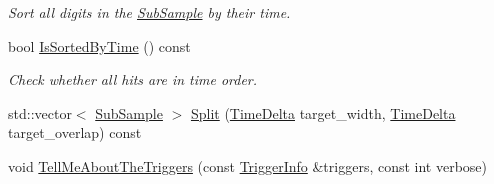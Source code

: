 \begin{DoxyCompactItemize}
\begin{DoxyCompactList}\small\item\em Sort all digits in the \hyperlink{classSubSample}{Sub\-Sample} by their time. \end{DoxyCompactList}\item 
\hypertarget{classSubSample_ab2b86eb86fd4c4e7d57b38241de53803}{bool \hyperlink{classSubSample_ab2b86eb86fd4c4e7d57b38241de53803}{Is\-Sorted\-By\-Time} () const }\label{classSubSample_ab2b86eb86fd4c4e7d57b38241de53803}

\begin{DoxyCompactList}\small\item\em Check whether all hits are in time order. \end{DoxyCompactList}\item 
std\-::vector$<$ \hyperlink{classSubSample}{Sub\-Sample} $>$ \hyperlink{classSubSample_ae91087e3c593a1870f61f3b656685915}{Split} (\hyperlink{classTimeDelta}{Time\-Delta} target\-\_\-width, \hyperlink{classTimeDelta}{Time\-Delta} target\-\_\-overlap) const 
\item 
void \hyperlink{classSubSample_a487b77424fb4df7202573d32fc2d8393}{Tell\-Me\-About\-The\-Triggers} (const \hyperlink{classTriggerInfo}{Trigger\-Info} \&triggers, const int verbose)
\end{DoxyCompactItemize}
